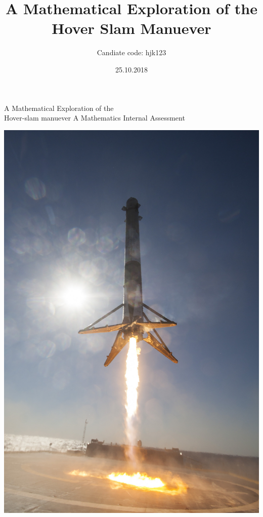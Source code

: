 \documentclass[12pt]{article}
\begin{document}
    \title{A Mathematical Exploration of the Hover Slam Manuever}
    \date{25.10.2018}
    \author{Candiate code: hjk123}
    \begin{titlepage}
        \begin{center}
            \Huge{A Mathematical Exploration of the \\ Hover-slam manuever}
            \break
            {\large A Mathematics Internal Assessment}
            \break
            

            \vspace{12mm}
            \includegraphics[scale=0.18]{hoverslam2.jpg}
            

        \end{center}
    \end{titlepage}
\end{document}
